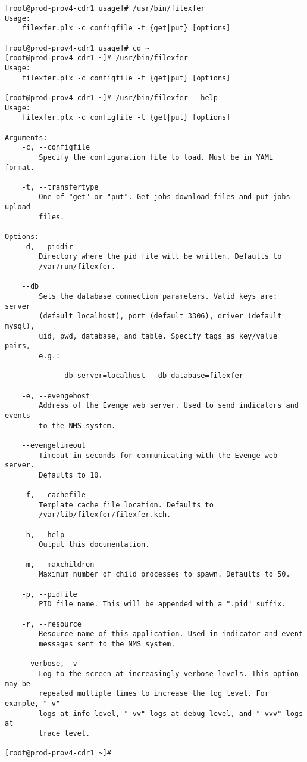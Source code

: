 \begin{verbatim}
[root@prod-prov4-cdr1 usage]# /usr/bin/filexfer
Usage:
    filexfer.plx -c configfile -t {get|put} [options]

[root@prod-prov4-cdr1 usage]# cd ~
[root@prod-prov4-cdr1 ~]# /usr/bin/filexfer
Usage:
    filexfer.plx -c configfile -t {get|put} [options]

[root@prod-prov4-cdr1 ~]# /usr/bin/filexfer --help
Usage:
    filexfer.plx -c configfile -t {get|put} [options]

Arguments:
    -c, --configfile
        Specify the configuration file to load. Must be in YAML format.

    -t, --transfertype
        One of "get" or "put". Get jobs download files and put jobs upload
        files.

Options:
    -d, --piddir
        Directory where the pid file will be written. Defaults to
        /var/run/filexfer.

    --db
        Sets the database connection parameters. Valid keys are: server
        (default localhost), port (default 3306), driver (default mysql),
        uid, pwd, database, and table. Specify tags as key/value pairs,
        e.g.:

            --db server=localhost --db database=filexfer

    -e, --evengehost
        Address of the Evenge web server. Used to send indicators and events
        to the NMS system.

    --evengetimeout
        Timeout in seconds for communicating with the Evenge web server.
        Defaults to 10.

    -f, --cachefile
        Template cache file location. Defaults to
        /var/lib/filexfer/filexfer.kch.

    -h, --help
        Output this documentation.

    -m, --maxchildren
        Maximum number of child processes to spawn. Defaults to 50.

    -p, --pidfile
        PID file name. This will be appended with a ".pid" suffix.

    -r, --resource
        Resource name of this application. Used in indicator and event
        messages sent to the NMS system.

    --verbose, -v
        Log to the screen at increasingly verbose levels. This option may be
        repeated multiple times to increase the log level. For example, "-v"
        logs at info level, "-vv" logs at debug level, and "-vvv" logs at
        trace level.

[root@prod-prov4-cdr1 ~]# 
\end{verbatim}

